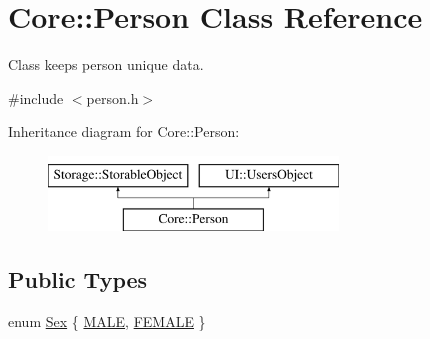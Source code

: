 \hypertarget{classCore_1_1Person}{
\section{Core::Person Class Reference}
\label{d9/d71/classCore_1_1Person}
}


Class keeps person unique data.  




{\ttfamily \#include $<$person.h$>$}

Inheritance diagram for Core::Person:\begin{figure}[H]
\begin{center}
\leavevmode
\includegraphics[height=2.000000cm]{d9/d71/classCore_1_1Person}
\end{center}
\end{figure}
\subsection*{Public Types}
\begin{DoxyCompactItemize}
\item 
enum \hyperlink{classCore_1_1Person_a01e6eee93727f9ce06525eca689b4764}{Sex} \{ \hyperlink{classCore_1_1Person_a01e6eee93727f9ce06525eca689b4764aeb7355bb082d0aa0d2b315e5dfaa2de9}{MALE}, 
\hyperlink{classCore_1_1Person_a01e6eee93727f9ce06525eca689b4764a0c4f3aef529b75d197d411a6336ec3a1}{FEMALE}
 \}
\end{DoxyCompactItemize}
